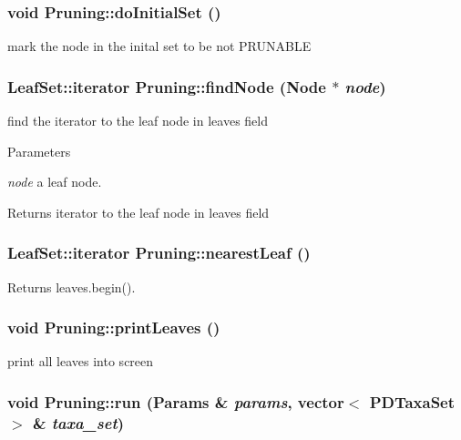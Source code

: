 \hypertarget{classPruning_a03ad4c7dce2fee530783d4b783ac32e4}{
\subsubsection[{doInitialSet}]{\setlength{\rightskip}{0pt plus 5cm}void Pruning::doInitialSet ()}}
\label{classPruning_a03ad4c7dce2fee530783d4b783ac32e4}
mark the node in the inital set to be not PRUNABLE \hypertarget{classPruning_a973dc17e371f5104adef79f4c227e81a}{
\subsubsection[{findNode}]{\setlength{\rightskip}{0pt plus 5cm}LeafSet::iterator Pruning::findNode ({\bf Node} $\ast$ {\em node})}}
\label{classPruning_a973dc17e371f5104adef79f4c227e81a}
find the iterator to the leaf node in leaves field 
\begin{DoxyParams}{Parameters}
\item[{\em node}]a leaf node. \end{DoxyParams}
\begin{DoxyReturn}{Returns}
iterator to the leaf node in leaves field 
\end{DoxyReturn}
\hypertarget{classPruning_a9cf587b15c0bcabf01531a916d2338d5}{
\subsubsection[{nearestLeaf}]{\setlength{\rightskip}{0pt plus 5cm}LeafSet::iterator Pruning::nearestLeaf ()}}
\label{classPruning_a9cf587b15c0bcabf01531a916d2338d5}
\begin{DoxyReturn}{Returns}
leaves.begin(). 
\end{DoxyReturn}
\hypertarget{classPruning_ae0e583aa4e812cdce06af4cc634e0110}{
\subsubsection[{printLeaves}]{\setlength{\rightskip}{0pt plus 5cm}void Pruning::printLeaves ()}}
\label{classPruning_ae0e583aa4e812cdce06af4cc634e0110}
print all leaves into screen \hypertarget{classPruning_a9ee0d53c821bfca89ebe57f090eeba99}{
\subsubsection[{run}]{\setlength{\rightskip}{0pt plus 5cm}void Pruning::run ({\bf Params} \& {\em params}, \/  vector$<$ {\bf PDTaxaSet} $>$ \& {\em taxa\_\-set})}}
